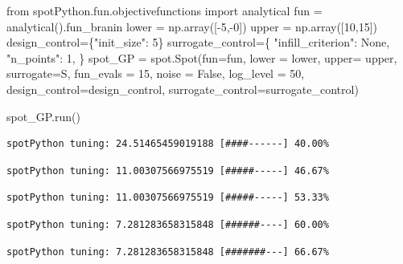 \documentclass[
  letterpaper,
  DIV=11,
  numbers=noendperiod]{scrreprt}
\newenvironment{Shaded}{\begin{snugshade}}{\end{snugshade}}
\newcommand{\DecValTok}[1]{\textcolor[rgb]{0.68,0.00,0.00}{#1}}
\newcommand{\ImportTok}[1]{\textcolor[rgb]{0.00,0.46,0.62}{#1}}
\newcommand{\NormalTok}[1]{\textcolor[rgb]{0.00,0.23,0.31}{#1}}
\newcommand{\OperatorTok}[1]{\textcolor[rgb]{0.37,0.37,0.37}{#1}}
\newcommand{\StringTok}[1]{\textcolor[rgb]{0.13,0.47,0.30}{#1}}
\newcommand{\VariableTok}[1]{\textcolor[rgb]{0.07,0.07,0.07}{#1}}
\begin{document}
\begin{Shaded}
\begin{Highlighting}[]
\ImportTok{from}\NormalTok{ spotPython.fun.objectivefunctions }\ImportTok{import}\NormalTok{ analytical}
\NormalTok{fun }\OperatorTok{=}\NormalTok{ analytical().fun\_branin}
\NormalTok{lower }\OperatorTok{=}\NormalTok{ np.array([}\OperatorTok{{-}}\DecValTok{5}\NormalTok{,}\OperatorTok{{-}}\DecValTok{0}\NormalTok{])}
\NormalTok{upper }\OperatorTok{=}\NormalTok{ np.array([}\DecValTok{10}\NormalTok{,}\DecValTok{15}\NormalTok{])}
\NormalTok{design\_control}\OperatorTok{=}\NormalTok{\{}\StringTok{"init\_size"}\NormalTok{: }\DecValTok{5}\NormalTok{\}}
\NormalTok{surrogate\_control}\OperatorTok{=}\NormalTok{\{}
            \StringTok{"infill\_criterion"}\NormalTok{: }\VariableTok{None}\NormalTok{,}
            \StringTok{"n\_points"}\NormalTok{: }\DecValTok{1}\NormalTok{,}
\NormalTok{        \}}
\NormalTok{spot\_GP }\OperatorTok{=}\NormalTok{ spot.Spot(fun}\OperatorTok{=}\NormalTok{fun, lower }\OperatorTok{=}\NormalTok{ lower, upper}\OperatorTok{=}\NormalTok{ upper, surrogate}\OperatorTok{=}\NormalTok{S, }
\NormalTok{                    fun\_evals }\OperatorTok{=} \DecValTok{15}\NormalTok{, noise }\OperatorTok{=} \VariableTok{False}\NormalTok{, log\_level }\OperatorTok{=} \DecValTok{50}\NormalTok{,}
\NormalTok{                    design\_control}\OperatorTok{=}\NormalTok{design\_control,}
\NormalTok{                    surrogate\_control}\OperatorTok{=}\NormalTok{surrogate\_control)}

\NormalTok{spot\_GP.run()}
\end{Highlighting}
\end{Shaded}

\begin{verbatim}
spotPython tuning: 24.51465459019188 [####------] 40.00% 
\end{verbatim}

\begin{verbatim}
spotPython tuning: 11.00307566975519 [#####-----] 46.67% 
\end{verbatim}

\begin{verbatim}
spotPython tuning: 11.00307566975519 [#####-----] 53.33% 
\end{verbatim}

\begin{verbatim}
spotPython tuning: 7.281283658315848 [######----] 60.00% 
\end{verbatim}

\begin{verbatim}
spotPython tuning: 7.281283658315848 [#######---] 66.67% 
\end{verbatim}
\end{document}
